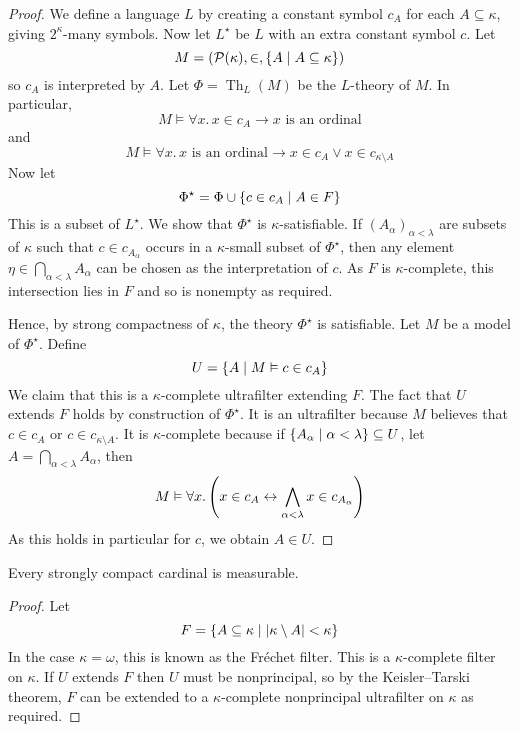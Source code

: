 \begin{proof}
    We define a language \( L \) by creating a constant symbol \( c_A \) for each \( A \subseteq \kappa \), giving \( 2^\kappa \)-many symbols.
    Now let \( L^\star \) be \( L \) with an extra constant symbol \( c \).
    Let
    \[ M = (\mathcal P(\kappa), \in, \qty{A \mid A \subseteq \kappa}) \]
    so \( c_A \) is interpreted by \( A \).
    Let \( \Phi = \operatorname{Th}_L(M) \) be the \( L \)-theory of \( M \).
    In particular,
    \[ M \vDash \forall x.\, x \in c_A \to x \text{ is an ordinal} \]
    and
    \[ M \vDash \forall x.\, x \text{ is an ordinal} \to x \in c_A \vee x \in c_{\kappa \setminus A} \]
    Now let
    \[ \Phi^\star = \Phi \cup \qty{c \in c_A \mid A \in F} \]
    This is a subset of \( L^\star \).
    We show that \( \Phi^\star \) is \( \kappa \)-satisfiable.
    If \( (A_\alpha)_{\alpha < \lambda} \) are subsets of \( \kappa \) such that \( c \in c_{A_\alpha} \) occurs in a \( \kappa \)-small subset of \( \Phi^\star \), then any element \( \eta \in \bigcap_{\alpha < \lambda} A_\alpha \) can be chosen as the interpretation of \( c \).
    As \( F \) is \( \kappa \)-complete, this intersection lies in \( F \) and so is nonempty as required.

    Hence, by strong compactness of \( \kappa \), the theory \( \Phi^\star \) is satisfiable.
    Let \( M \) be a model of \( \Phi^\star \).
    Define
    \[ U = \qty{A \mid M \vDash c \in c_A} \]
    We claim that this is a \( \kappa \)-complete ultrafilter extending \( F \).
    The fact that \( U \) extends \( F \) holds by construction of \( \Phi^\star \).
    It is an ultrafilter because \( M \) believes that \( c \in c_A \) or \( c \in c_{\kappa \setminus A} \).
    It is \( \kappa \)-complete because if \( \qty{A_\alpha \mid \alpha < \lambda} \subseteq U \), let \( A = \bigcap_{\alpha < \lambda} A_\alpha \), then
    \[ M \vDash \forall x.\, \qty(x \in c_A \leftrightarrow \bigwedge_{\alpha < \lambda} x \in c_{A_\alpha}) \]
    As this holds in particular for \( c \), we obtain \( A \in U \).
\end{proof}
\begin{corollary}
    Every strongly compact cardinal is measurable.
\end{corollary}
\begin{proof}
    Let
    \[ F = \qty{A \subseteq \kappa \mid \abs{\kappa\setminus A} < \kappa} \]
    In the case \( \kappa = \omega \), this is known as the Fr\'echet filter.
    This is a \( \kappa \)-complete filter on \( \kappa \).
    If \( U \) extends \( F \) then \( U \) must be nonprincipal, so by the Keisler--Tarski theorem, \( F \) can be extended to a \( \kappa \)-complete nonprincipal ultrafilter on \( \kappa \) as required.
\end{proof}

